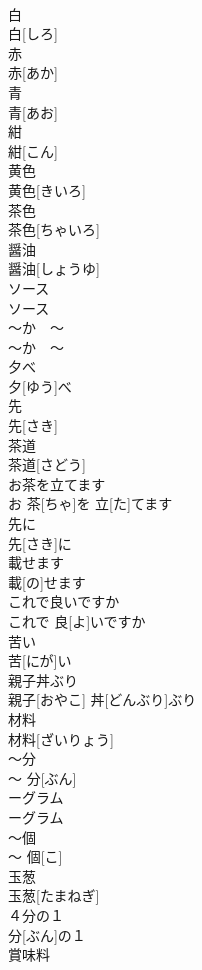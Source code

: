 \documentclass[8pt]{extreport}
\begin{document}
\begin{CJK}{UTF8}{min}
\\	白	
\\	白[しろ]	
\\	赤	
\\	赤[あか]	
\\	青	
\\	青[あお]	
\\	紺	
\\	紺[こん]	
\\	黄色	
\\	黄色[きいろ]	
\\	茶色	
\\	茶色[ちゃいろ]	
\\	醤油	
\\	醤油[しょうゆ]	
\\	ソース	
\\	ソース	
\\	〜か　〜	
\\	〜か　〜	
\\	夕べ	
\\	夕[ゆう]べ	
\\	先	
\\	先[さき]	
\\	茶道	
\\	茶道[さどう]	
\\	お茶を立てます	
\\	お 茶[ちゃ]を 立[た]てます	
\\	先に	
\\	先[さき]に	
\\	載せます	
\\	載[の]せます	
\\	これで良いですか	
\\	これで 良[よ]いですか	
\\	苦い	
\\	苦[にが]い	
\\	親子丼ぶり	
\\	親子[おやこ] 丼[どんぶり]ぶり	
\\	材料	
\\	材料[ざいりょう]	
\\	〜分	
\\	〜 分[ぶん]	
\\	ーグラム	
\\	ーグラム	
\\	〜個	
\\	〜 個[こ]	
\\	玉葱	
\\	玉葱[たまねぎ]	
\\	４分の１	
\\	分[ぶん]の１	
\\	賞味料	

\end{CJK}
\end{document}
